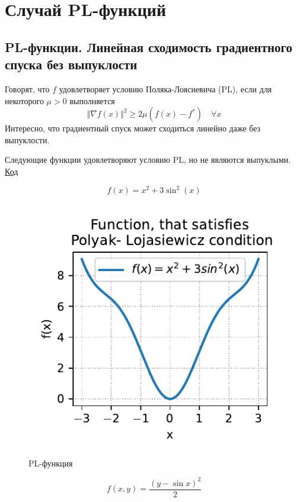 \documentclass[
  russian,
  letterpaper,
  DIV=11,
  numbers=noendperiod]{scrartcl}
\begin{document}
\section{Случай
PL-функций}\label{ux441ux43bux443ux447ux430ux439-pl-ux444ux443ux43dux43aux446ux438ux439}

\subsection{PL-функции. Линейная сходимость градиентного спуска без
выпуклости}\label{pl-ux444ux443ux43dux43aux446ux438ux438.-ux43bux438ux43dux435ux439ux43dux430ux44f-ux441ux445ux43eux434ux438ux43cux43eux441ux442ux44c-ux433ux440ux430ux434ux438ux435ux43dux442ux43dux43eux433ux43e-ux441ux43fux443ux441ux43aux430-ux431ux435ux437-ux432ux44bux43fux443ux43aux43bux43eux441ux442ux438}

Говорят, что \(f\) удовлетворяет условию Поляка-Лоясиевича (PL), если
для некоторого \(\mu > 0\) выполняется \[
\Vert \nabla f(x) \Vert^2 \geq 2 \mu (f(x) - f^*) \quad \forall x
\] Интересно, что градиентный спуск может сходиться линейно даже без
выпуклости.

Следующие функции удовлетворяют условию PL, но не являются выпуклыми.
\href{https://colab.research.google.com/github/MerkulovDaniil/optim/blob/master/assets/Notebooks/PL_function.ipynb}{\faPython Код}

\[
f(x) = x^2 + 3\sin^2(x)
\]

\begin{figure}[H]

{\centering \includegraphics[width=0.5\linewidth,height=\textheight,keepaspectratio]{pl_2d.pdf}

}

\caption{PL-функция}

\end{figure}%

\[
f(x,y) = \dfrac{(y - \sin x)^2}{2}
\]
\end{document}
